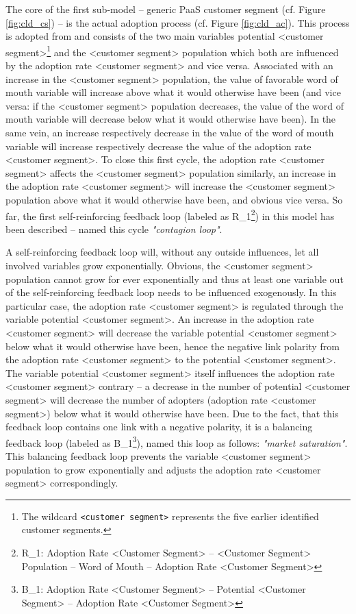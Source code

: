 The core of the first sub-model -- generic \ac{PaaS} customer segment (cf. Figure \ref{fig:cld_cs}) -- is the actual adoption process (cf. Figure \ref{fig:cld_ac}). This process is adopted from \citet[p. 18]{Sterman2001} and consists of the two main variables potential <customer segment>\footnote{The wildcard \texttt{<customer segment>} represents the five earlier identified customer segments.} and the <customer segment> population which both are influenced by the adoption rate <customer segment> and vice versa. Associated with an increase in the <customer segment> population, the value of favorable word of mouth variable will increase above what it would otherwise have been (and vice versa: if the <customer segment> population decreases, the value of the word of mouth variable will decrease below what it would otherwise have been). In the same vein, an increase respectively decrease in the value of the word of mouth variable will increase respectively decrease the value of the adoption rate <customer segment>. To close this first cycle, the adoption rate <customer segment> affects the <customer segment> population similarly, an increase in the adoption rate <customer segment> will increase the <customer segment> population above what it would otherwise have been, and obvious vice versa. So far, the first self-reinforcing feedback loop (labeled as R\_1\footnote{R\_1: Adoption Rate <Customer Segment> -- <Customer Segment> Population -- Word of Mouth -- Adoption Rate <Customer Segment>}) in this model has been described -- \citet[p. 19]{Sterman2001} named this cycle \textit{"contagion loop"}. 

A self-reinforcing feedback loop will, without any outside influences, let all involved variables grow exponentially. Obvious, the <customer segment> population cannot grow for ever exponentially and thus at least one variable out of the self-reinforcing feedback loop needs to be influenced exogenously. In this particular case, the adoption rate <customer segment> is regulated through the variable potential <customer segment>. An increase in the adoption rate <customer segment> will decrease the variable potential <customer segment> below what it would otherwise have been, hence the negative link polarity from the adoption rate <customer segment> to the potential <customer segment>. The variable potential <customer segment> itself influences the adoption rate <customer segment> contrary -- a decrease in the number of potential <customer segment> will decrease the number of adopters (adoption rate <customer segment>) below what it would otherwise have been. Due to the fact, that this feedback loop contains one link with a negative polarity, it is a balancing feedback loop (labeled as B\_1\footnote{B\_1: Adoption Rate <Customer Segment> -- Potential <Customer Segment> -- Adoption Rate <Customer Segment>}), \citet[p. 18]{Sterman2001} named this loop as follows: \textit{"market saturation"}. This balancing feedback loop prevents the variable <customer segment> population to grow exponentially and adjusts the adoption rate <customer segment> correspondingly.

